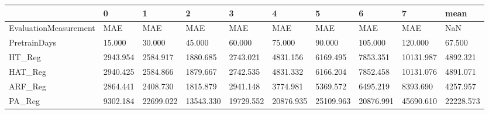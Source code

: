 \begin{tabular}{llllllllll}
\toprule
{} &        0 &         1 &         2 &         3 &         4 &         5 &         6 &         7 &      mean \\
\midrule
EvaluationMeasurement &      MAE &       MAE &       MAE &       MAE &       MAE &       MAE &       MAE &       MAE &       NaN \\
PretrainDays          &   15.000 &    30.000 &    45.000 &    60.000 &    75.000 &    90.000 &   105.000 &   120.000 &    67.500 \\
HT\_Reg                & 2943.954 &  2584.917 &  1880.685 &  2743.021 &  4831.156 &  6169.495 &  7853.351 & 10131.987 &  4892.321 \\
HAT\_Reg               & 2940.425 &  2584.866 &  1879.667 &  2742.535 &  4831.332 &  6166.204 &  7852.458 & 10131.076 &  4891.071 \\
ARF\_Reg               & 2864.441 &  2408.730 &  1815.879 &  2941.148 &  3774.981 &  5369.572 &  6495.219 &  8393.690 &  4257.957 \\
PA\_Reg                & 9302.184 & 22699.022 & 13543.330 & 19729.552 & 20876.935 & 25109.963 & 20876.991 & 45690.610 & 22228.573 \\
\bottomrule
\end{tabular}
